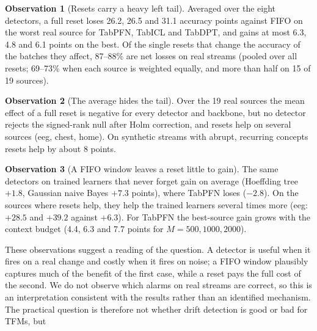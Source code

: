 \documentclass[10pt]{article}
\theoremstyle{definition}
\newtheorem{observation}{Observation}
\theoremstyle{remark}
\begin{document}
\begin{observation}[Resets carry a heavy left tail]
\label{obs:tail}
Averaged over the eight detectors, a full reset loses 26.2, 26.5 and 31.1 accuracy points against FIFO on the worst
real source for TabPFN, TabICL and TabDPT, and gains at most 6.3, 4.8 and 6.1 points on the best. Of the single resets
that change the accuracy of the batches they affect, 87--88\% are net losses on real streams (pooled over all resets;
69--73\% when each source is weighted equally, and more than half on 15 of 19 sources).
\end{observation}

\begin{observation}[The average hides the tail]
\label{obs:average}
Over the 19 real sources the mean effect of a full reset is negative for every detector and backbone, but no detector
rejects the signed-rank null after Holm correction, and resets help on several sources (eeg, chest, home). On synthetic streams with
abrupt, recurring concepts resets help by about 8 points.
\end{observation}

\begin{observation}[A FIFO window leaves a reset little to gain]
\label{obs:fifo}
The same detectors on trained learners that never forget gain on average (Hoeffding tree $+1.8$, Gaussian naive
Bayes $+7.3$ points), where TabPFN loses ($-2.8$). On the sources where resets help, they help the trained learners
several times more (eeg: $+28.5$ and $+39.2$ against $+6.3$). For TabPFN the best-source gain grows with the context budget (4.4, 6.3 and 7.7 points for
$M=500,1000,2000$).
\end{observation}

These observations suggest a reading of the question. A detector is useful when it fires on a real change and costly
when it fires on noise; a FIFO window plausibly captures much of the benefit of the first case, while a reset pays the
full cost of the second. We do not observe which alarms on real streams are correct, so this is an interpretation
consistent with the results rather than an identified mechanism. The practical question is therefore not whether drift detection is good or bad for TFMs, but

\begin{center}
\end{center}
\end{document}
